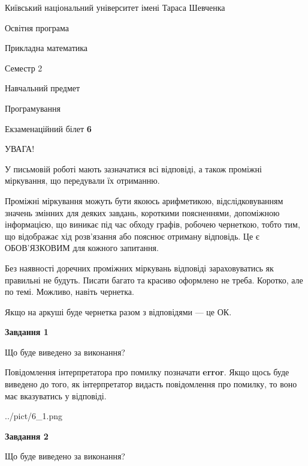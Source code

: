 \documentclass[12pt, ukrainian]{article}
\begin{document}
{{\begin {small}\par
{ \center  Київський національний університет імені Тараса Шевченка \par}
{\parbox {5 cm}{Освітня програма \hfill}{\parbox {7 cm}{Прикладна математика \hfill}}\parbox {6 cm}{\hfill Семестр 2}}\par
{\parbox {5 cm} {Навчальний предмет \hfill}\parbox {7 cm}{Програмування \hfill}\parbox {6cm}{\hfill}\par}\vspace{-7pt} \end{small}}{\center Екзаменаційний білет \No \textbf
{ 6 }\par}}
{
\begin {large}
УВАГА!

У письмовій роботі мають зазначатися всі відповіді, а також проміжні міркування, що передували їх отриманню.

Проміжні міркування можуть бути якоюсь арифметикою, відслідковуванням зна\-чень змінних для деяких завдань,
короткими поясненнями, допоміжною інформацією, що виникає під час обходу графів, робочею чернеткою,
тобто тим, що відображає хід розв’язання або пояснює отриману відповідь.
Це є ОБОВ’ЯЗКОВИМ для кожного запитання.

Без наявності доречних проміжних міркувань відповіді зараховуватись як правиль\-ні не будуть.
Писати багато та красиво оформлено не треба. Коротко, але по темі. Можли\-во, навіть чернетка.

Якщо на аркуші буде чернетка разом з відповідями --- це ОК.

\newpage

{\begin {center}\textbf{Завдання 1}\end {center}}\par
Що буде виведено за виконання?

Повідомлення інтерпретатора про помилку позначати \textbf{error}.
Якщо щось буде виведено до того, як інтерпретатор видасть повідомлення про помилку, 
то воно має вказуватись у відповіді. \par


\begin{center}
	{../pict/6_1.png}
\end{center}
\newpage

{\begin {center}\textbf{Завдання 2}\end {center}}\par
Що буде виведено за виконання?


\end{large}}
\end{document}
